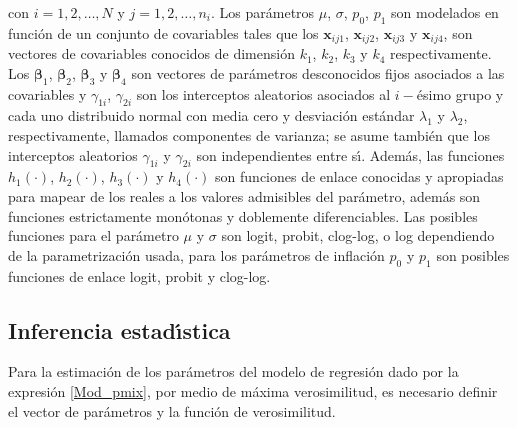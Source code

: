 
con $i=1,2,\ldots, N$ y $j=1,2,\ldots, n_i$. Los par\'{a}metros $\mu$, $\sigma$, $p_0$, $p_1$ son modelados en funci\'{o}n de un conjunto de covariables tales que los $\mathbf{x}_{ij1}$, $\mathbf{x}_{ij2}$, $\mathbf{x}_{ij3}$ y $\mathbf{x}_{ij4}$, son vectores de covariables conocidos de dimensi\'{o}n $k_1$, $k_2$, $k_3$ y $k_4$ respectivamente. Los $\boldsymbol{\beta}_1$, $\boldsymbol{\beta}_2$, $\boldsymbol{\beta}_3$ y $\boldsymbol{\beta}_4$ son vectores de par\'{a}metros desconocidos fijos asociados a las covariables y $\gamma_{1i}$, $\gamma_{2i}$ son los interceptos aleatorios asociados al $i-$\'{e}simo grupo y cada uno distribuido normal con media cero y desviaci\'{o}n est\'{a}ndar $\lambda_1$ y $\lambda_2$, respectivamente, llamados componentes de varianza; se asume tambi\'{e}n que los interceptos aleatorios $\gamma_{1i}$ y $\gamma_{2i}$ son independientes entre s\'{\i}. Adem\'{a}s, las funciones $h_1(\cdot)$, $h_2(\cdot)$, $h_3(\cdot)$ y $h_4(\cdot)$ son funciones de enlace conocidas y apropiadas para mapear de los reales a los valores admisibles del par\'{a}metro, adem\'{a}s son funciones estrictamente mon\'{o}tonas y doblemente diferenciables. Las posibles funciones para el par\'{a}metro $\mu$ y $\sigma$ son logit, probit, clog-log, o log dependiendo de la parametrizaci\'{o}n usada, para los par\'{a}metros de inflaci\'{o}n $p_0$ y $p_1$ son posibles funciones de enlace logit, probit y clog-log.




\subsection{Inferencia estad\'{\i}stica}

Para la estimaci\'{o}n de los par\'{a}metros del modelo de regresi\'{o}n dado por la expresi\'{o}n \eqref{Mod_pmix}, por medio de m\'{a}xima verosimilitud, es necesario definir el vector de par\'{a}metros y la funci\'{o}n de verosimilitud.

